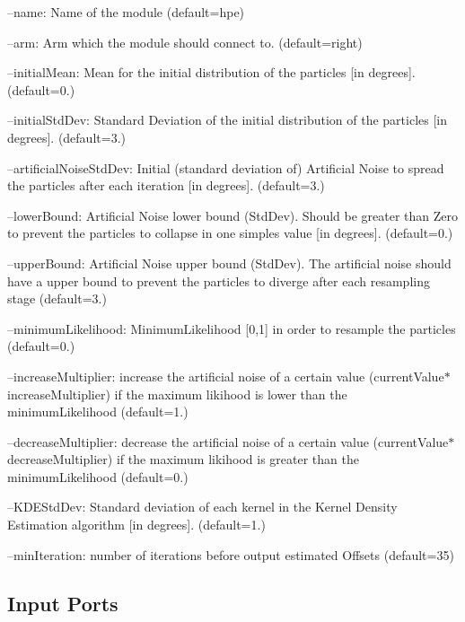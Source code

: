 \begin{DoxyItemize}
\item --name\+: Name of the module (default=\textquotesingle{}hpe\textquotesingle{})
\item --arm\+: Arm which the module should connect to. (default=\textquotesingle{}right\textquotesingle{})
\item --initial\+Mean\+: Mean for the initial distribution of the particles \mbox{[}in degrees\mbox{]}. (default=0.)
\item --initial\+Std\+Dev\+: Standard Deviation of the initial distribution of the particles \mbox{[}in degrees\mbox{]}. (default=3.)
\item --artificial\+Noise\+Std\+Dev\+: Initial (standard deviation of) Artificial Noise to spread the particles after each iteration \mbox{[}in degrees\mbox{]}. (default=3.)
\item --lower\+Bound\+: Artificial Noise lower bound (Std\+Dev). Should be greater than Zero to prevent the particles to collapse in one simples value \mbox{[}in degrees\mbox{]}. (default=0.)
\item --upper\+Bound\+: Artificial Noise upper bound (Std\+Dev). The artificial noise should have a upper bound to prevent the particles to diverge after each resampling stage (default=3.)
\item --minimum\+Likelihood\+: Minimum\+Likelihood \mbox{[}0,1\mbox{]} in order to resample the particles (default=0.)
\item --increase\+Multiplier\+: increase the artificial noise of a certain value (current\+Value$\ast$increase\+Multiplier) if the maximum likihood is lower than the minimum\+Likelihood (default=1.)
\item --decrease\+Multiplier\+: decrease the artificial noise of a certain value (current\+Value$\ast$decrease\+Multiplier) if the maximum likihood is greater than the minimum\+Likelihood (default=0.)
\item --K\+D\+E\+Std\+Dev\+: Standard deviation of each kernel in the Kernel Density Estimation algorithm \mbox{[}in degrees\mbox{]}. (default=1.)
\item --min\+Iteration\+: number of iterations before output estimated Offsets (default=35) 
\end{DoxyItemize}\hypertarget{group__handPoseEstimation-module_inputports_sec}{}\subsection{Input Ports}\label{group__handPoseEstimation-module_inputports_sec}


